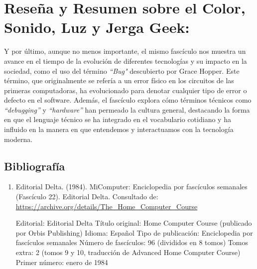 \documentclass[letterpaper, 12 pt]{article} %
\begin{document}
\section*{Reseña y Resumen sobre el Color, Sonido, Luz y Jerga Geek:}
Y por último, aunque no menos importante, el mismo fascículo nos muestra un avance en el tiempo de la evolución de diferentes tecnologías y su impacto en la sociedad, como el uso del término \textit{“Bug"} descubierto por Grace Hopper. Este término, que originalmente se refería a un error físico en los circuitos de las primeras computadoras, ha evolucionado para denotar cualquier tipo de error o defecto en el software. Además, el fascículo explora cómo términos técnicos como \textit{“debugging”} y \textit{“hardware”} han permeado la cultura general, destacando la forma en que el lenguaje técnico se ha integrado en el vocabulario cotidiano y ha influido en la manera en que entendemos y interactuamos con la tecnología moderna.



\subsection*{Bibliografía}

    \nocite{*}
    \begin{enumerate}[label = \textbf{•}]
        \item Editorial Delta. (1984). MiComputer: Enciclopedia por fascículos semanales (Fascículo 22). Editorial Delta. Consultado de: \url{https://archive.org/details/The_Home_Computer_Course}

        Editorial: Editorial Delta
        Título original: Home Computer Course (publicado por Orbis Publishing)
        Idioma: Español
        Tipo de publicación: Enciclopedia por fascículos semanales
        Número de fascículos: 96 (divididos en 8 tomos)
        Tomos extra: 2 (tomos 9 y 10, traducción de Advanced Home Computer Course)
        Primer número: enero de 1984
    \end{enumerate}
    
\end{document}
